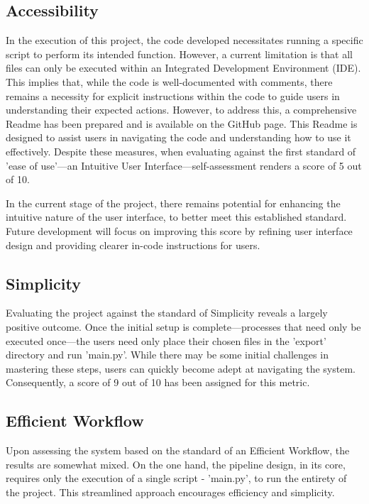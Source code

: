 \documentclass[10pt,twocolumn]{article}
\begin{document}
\subsection {Accessibility}
In the execution of this project, the code developed necessitates running a specific script to perform its intended function. However, a current limitation is that all files can only be executed within an Integrated Development Environment (IDE). This implies that, while the code is well-documented with comments, there remains a necessity for explicit instructions within the code to guide users in understanding their expected actions.
However, to address this, a comprehensive Readme has been prepared and is available on the GitHub page. This Readme is designed to assist users in navigating the code and understanding how to use it effectively.
Despite these measures, when evaluating against the first standard of 'ease of use'—an Intuitive User Interface—self-assessment renders a score of 5 out of 10.

In the current stage of the project, there remains potential for enhancing the intuitive nature of the user interface, to better meet this established standard. Future development will focus on improving this score by refining user interface design and providing clearer in-code instructions for users.

\subsection{Simplicity}
Evaluating the project against the standard of Simplicity reveals a largely positive outcome. Once the initial setup is complete—processes that need only be executed once—the users need only place their chosen files in the 'export' directory and run 'main.py'. While there may be some initial challenges in mastering these steps, users can quickly become adept at navigating the system. Consequently, a score of 9 out of 10 has been assigned for this metric.

\subsection{Efficient Workflow}

Upon assessing the system based on the standard of an Efficient Workflow, the results are somewhat mixed. On the one hand, the pipeline design, in its core, requires only the execution of a single script - 'main.py', to run the entirety of the project. This streamlined approach encourages efficiency and simplicity.
\end{document}
